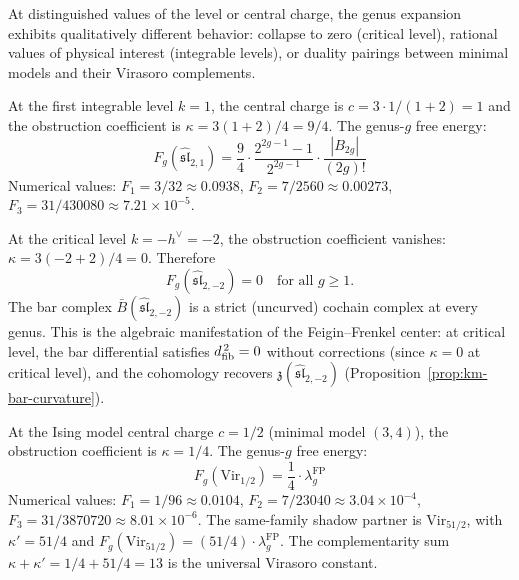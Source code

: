 At distinguished values of the level or central charge, the
genus expansion exhibits qualitatively different behavior:
collapse to zero (critical level), rational values of
physical interest (integrable levels), or duality pairings
between minimal models and their Virasoro complements.

\begin{computation}[\texorpdfstring{$\widehat{\mathfrak{sl}}_2$}{sl-hat_2} at level \texorpdfstring{$k = 1$}{k = 1}]
\label{comp:sl2-k1-genera}
At the first integrable level $k = 1$, the central charge is
$c = 3 \cdot 1/(1+2) = 1$ and the obstruction coefficient
is $\kappa = 3(1+2)/4 = 9/4$.  The genus-$g$ free energy:
\[
F_g(\widehat{\mathfrak{sl}}_{2,1}) = \frac{9}{4}
\cdot \frac{2^{2g-1}-1}{2^{2g-1}} \cdot
\frac{|B_{2g}|}{(2g)!}
\]
Numerical values:
$F_1 = 3/32 \approx 0.0938$,
$F_2 = 7/2560 \approx 0.00273$,
$F_3 = 31/430080 \approx 7.21 \times 10^{-5}$.
\end{computation}

\begin{computation}[\texorpdfstring{$\widehat{\mathfrak{sl}}_2$}{sl-hat_2} at critical
level \texorpdfstring{$k = -2$}{k = -2}]
\label{comp:sl2-critical-genera}
At the critical level $k = -h^\vee = -2$, the obstruction
coefficient vanishes: $\kappa = 3(-2+2)/4 = 0$.  Therefore
\begin{equation}\label{eq:sl2-critical-vanishing}
F_g(\widehat{\mathfrak{sl}}_{2,-2}) = 0
\quad \text{for all } g \geq 1.
\end{equation}
The bar complex $\bar{B}(\widehat{\mathfrak{sl}}_{2,-2})$
is a strict (uncurved) cochain complex at every genus.
This is the algebraic manifestation of the Feigin--Frenkel
center: at critical level, the bar differential satisfies
$d_{\mathrm{fib}}^{\,2} = 0$ without corrections (since $\kappa = 0$ at critical level), and the cohomology recovers
$\mathfrak{z}(\widehat{\mathfrak{sl}}_{2,-2})$
(Proposition~\ref{prop:km-bar-curvature}).
\end{computation}

\begin{computation}[Virasoro at \texorpdfstring{$c = 1/2$}{c = 1/2} (Ising model)]
\label{comp:vir-ising-genera}
At the Ising model central charge $c = 1/2$
(minimal model $(3,4)$), the obstruction coefficient is
$\kappa = 1/4$.  The genus-$g$ free energy:
\begin{equation}\label{eq:ising-Fg}
F_g(\mathrm{Vir}_{1/2}) = \frac{1}{4}
\cdot \lambda_g^{\mathrm{FP}}
\end{equation}
Numerical values:
$F_1 = 1/96 \approx 0.0104$,
$F_2 = 7/23040 \approx 3.04 \times 10^{-4}$,
$F_3 = 31/3870720 \approx 8.01 \times 10^{-6}$.
The same-family shadow partner is $\mathrm{Vir}_{51/2}$, with
$\kappa' = 51/4$ and
$F_g(\mathrm{Vir}_{51/2}) = (51/4) \cdot
\lambda_g^{\mathrm{FP}}$.  The complementarity sum
$\kappa + \kappa' = 1/4 + 51/4 = 13$ is the universal
Virasoro constant.
\end{computation}


